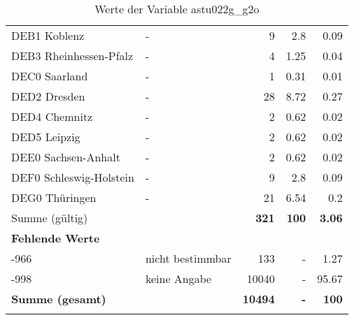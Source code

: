 \begin{longtable}{Xlrrr}
        \multicolumn{1}{X}{DEB1 Koblenz} & - & \num{9} & \num[round-mode=places,round-precision=2]{2.8} & \num[round-mode=places,round-precision=2]{0.09} \\
        \multicolumn{1}{X}{DEB3 Rheinhessen-Pfalz} & - & \num{4} & \num[round-mode=places,round-precision=2]{1.25} & \num[round-mode=places,round-precision=2]{0.04} \\
        \multicolumn{1}{X}{DEC0 Saarland} & - & \num{1} & \num[round-mode=places,round-precision=2]{0.31} & \num[round-mode=places,round-precision=2]{0.01} \\
        \multicolumn{1}{X}{DED2 Dresden} & - & \num{28} & \num[round-mode=places,round-precision=2]{8.72} & \num[round-mode=places,round-precision=2]{0.27} \\
        \multicolumn{1}{X}{DED4 Chemnitz} & - & \num{2} & \num[round-mode=places,round-precision=2]{0.62} & \num[round-mode=places,round-precision=2]{0.02} \\
        \multicolumn{1}{X}{DED5 Leipzig} & - & \num{2} & \num[round-mode=places,round-precision=2]{0.62} & \num[round-mode=places,round-precision=2]{0.02} \\
        \multicolumn{1}{X}{DEE0 Sachsen-Anhalt} & - & \num{2} & \num[round-mode=places,round-precision=2]{0.62} & \num[round-mode=places,round-precision=2]{0.02} \\
        \multicolumn{1}{X}{DEF0 Schleswig-Holstein} & - & \num{9} & \num[round-mode=places,round-precision=2]{2.8} & \num[round-mode=places,round-precision=2]{0.09} \\
        \multicolumn{1}{X}{DEG0 Thüringen} & - & \num{21} & \num[round-mode=places,round-precision=2]{6.54} & \num[round-mode=places,round-precision=2]{0.2} \\
     \midrule
      \multicolumn{2}{l}{Summe (gültig)} & \textbf{\num{321}} &
      \textbf{\num{100}} &
         \textbf{\num[round-mode=places,round-precision=2]{3.06}} \\
     \multicolumn{5}{l}{\textbf{Fehlende Werte}}\\
       -966 & nicht bestimmbar & \num{133} & - & \num[round-mode=places,round-precision=2]{1.27} \\

       -998 & keine Angabe & \num{10040} & - & \num[round-mode=places,round-precision=2]{95.67} \\

     \midrule
     \multicolumn{2}{l}{\textbf{Summe (gesamt)}} & \textbf{\num{10494}} & \textbf{-} & \textbf{\num{100}} \\
     \bottomrule
     \caption{Werte der Variable astu022g\_g2o}
     \end{longtable}
     
